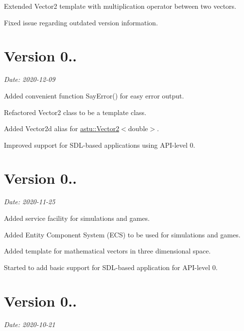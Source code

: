 \begin{DoxyItemize}
\item Extended {\ttfamily Vector2} template with multiplication operator between two vectors.
\item Fixed issue regarding outdated version information.
\end{DoxyItemize}

\section*{Version 0..}

{\itshape Date\+: 2020-\/12-\/09}


\begin{DoxyItemize}
\item Added convenient function {\ttfamily Say\+Error()} for easy error output.
\item Refactored {\ttfamily Vector2} class to be a template class.
\item Added {\ttfamily Vector2d} alias for {\ttfamily \hyperlink{classastu_1_1Vector2}{astu\+::\+Vector2}$<$double$>$}.
\item Improved support for S\+D\+L-\/based applications using A\+P\+I-\/level 0.
\end{DoxyItemize}

\section*{Version 0..}

{\itshape Date\+: 2020-\/11-\/25}


\begin{DoxyItemize}
\item Added service facility for simulations and games.
\item Added Entity Component System (E\+CS) to be used for simulations and games.
\item Added template for mathematical vectors in three dimensional space.
\item Started to add basic support for S\+D\+L-\/based application for A\+P\+I-\/level 0.
\end{DoxyItemize}

\section*{Version 0..}

{\itshape Date\+: 2020-\/10-\/21}


